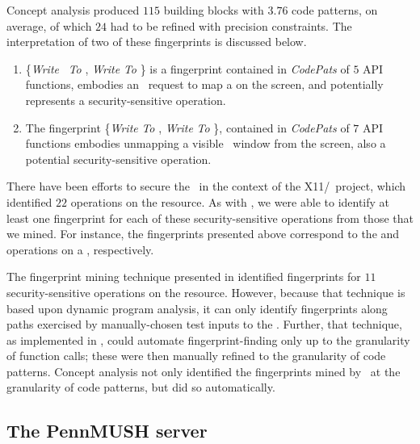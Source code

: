 Concept analysis produced $115$ building blocks with $3.76$ code
patterns, on average, of which $24$ had to be refined with precision
constraints. The interpretation of two of these fingerprints is discussed
below.  

\begin{enumerate}
%
\item 
\{\textit{Write} \unk\ \textit{To} ,
\textit{Write}  \textit{To} \} is a 
fingerprint contained in \textit{CodePats} of $5$ API functions, embodies an
\xclient\ request to map a  on the screen, and potentially
represents a security-sensitive operation.
%
\item The fingerprint \{\textit{Write}  \textit{To}
, \textit{Write}  \textit{To}
\}, contained in \textit{CodePats} of $7$ API functions
embodies unmapping a visible \xclient\ window from the screen, also a potential
security-sensitive operation.  
%
\end{enumerate}

There have been efforts to secure the \xserver\ in the context of the
X11/\selinux\ project, which identified $22$ operations on the 
resource. As with \ext, we were able to identify at least one fingerprint for
each of these security-sensitive operations from those that we mined.  For
instance, the fingerprints presented above correspond to the 
and  operations on a , respectively.

The fingerprint mining technique presented in 
identified fingerprints for $11$ security-sensitive operations on the
 resource. However, because that technique is based upon dynamic
program analysis, it can only identify fingerprints along paths exercised by
manually-chosen test inputs to the \xserver.  Further, that technique, as
implemented in \aid, could automate fingerprint-finding only up to the
granularity of function calls; these were then manually refined to the
granularity of code patterns. Concept analysis not only identified the
fingerprints mined by \aid\ at the granularity of code patterns, but did so
automatically.  

\subsection{The PennMUSH server}
\label{subsection:results:pennmush}

